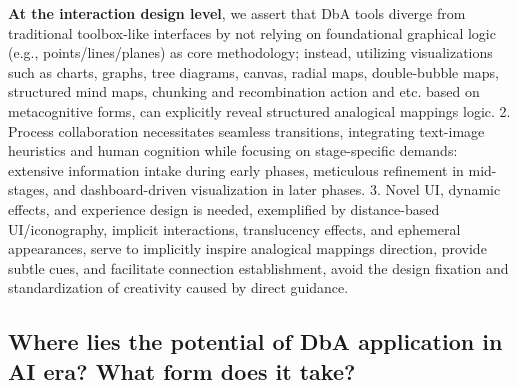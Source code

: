 \textbf{At the interaction design level}, we assert that DbA tools diverge from traditional toolbox-like interfaces by not relying on foundational graphical logic (e.g., points/lines/planes) as core methodology; instead, utilizing visualizations such as charts\cite{emerson2024anther}, graphs\cite{yan2023xcreation, huang2024field}, tree diagrams\cite{chen2024BIDTrain, chen2024asknaturenet}, canvas\cite{lin2025inkspire, masson2025textoshop}, radial maps, double-bubble maps, structured mind maps, chunking and recombination action and etc. based on metacognitive forms\cite{ball2019advancing}, can explicitly reveal structured analogical mappings logic\cite{gentner1983structure}. 
2. Process collaboration necessitates seamless transitions, integrating text-image heuristics and human cognition while focusing on stage-specific demands: extensive information intake during early phases, meticulous refinement in mid-stages, and dashboard-driven visualization in later phases\cite{kang2025biospark, srinivasan2024improving}. 
3. Novel UI, dynamic effects, and experience design is needed, exemplified by distance-based UI/iconography, implicit interactions\cite{ju2008design}, translucency effects, and ephemeral appearances, serve to implicitly inspire analogical mappings direction, provide subtle cues, and facilitate connection establishment, avoid the design fixation and standardization of creativity caused by direct guidance.


\subsection{Where lies the potential of DbA application in AI era? What form does it take?}

